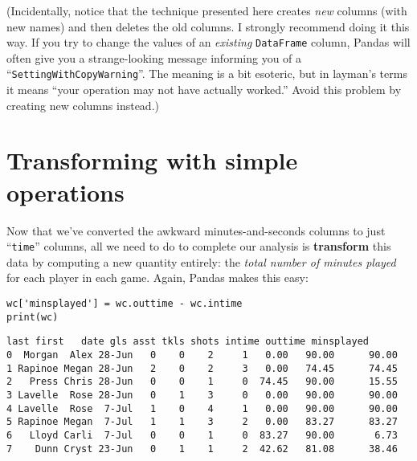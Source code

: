 \medskip

{\small
{}
(Incidentally, notice that the technique presented here creates \textit{new}
columns (with new names) and then deletes the old columns. I strongly recommend
doing it this way. If you try to change the values of an \textit{existing}
\texttt{DataFrame} column, Pandas will often give you a strange-looking message
informing you of a ``\texttt{SettingWithCopyWarning}''. The meaning is a bit
esoteric, but in layman's terms it means ``your operation may not have actually
worked.'' Avoid this problem by creating new columns instead.)}

\section{Transforming with simple operations}



Now that we've converted the awkward minutes-and-seconds columns to just
``\texttt{time}'' columns, all we need to do to complete our analysis is
\textbf{transform} this data by computing a new quantity entirely: the
\textit{total number of minutes played} for each player in each game. Again,
Pandas makes this easy:

\begin{Verbatim}[fontsize=\footnotesize,samepage=true,frame=single,framesep=3mm]
wc['minsplayed'] = wc.outtime - wc.intime
print(wc)
\end{Verbatim}
\vspace{-.2in}

\begin{Verbatim}[fontsize=\scriptsize,samepage=true,frame=leftline,framesep=5mm,framerule=1mm]
     last first   date gls asst tkls shots intime outtime minsplayed
0  Morgan  Alex 28-Jun   0    0    2     1   0.00   90.00      90.00
1 Rapinoe Megan 28-Jun   2    0    2     3   0.00   74.45      74.45
2   Press Chris 28-Jun   0    0    1     0  74.45   90.00      15.55
3 Lavelle  Rose 28-Jun   0    1    3     0   0.00   90.00      90.00
4 Lavelle  Rose  7-Jul   1    0    4     1   0.00   90.00      90.00
5 Rapinoe Megan  7-Jul   1    1    3     2   0.00   83.27      83.27
6   Lloyd Carli  7-Jul   0    0    1     0  83.27   90.00       6.73
7    Dunn Cryst 23-Jun   0    1    1     2  42.62   81.08      38.46
\end{Verbatim}

